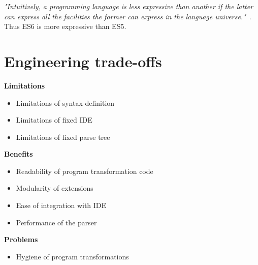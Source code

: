 \textit{"Intuitively, a programming language is less expressive than another if the latter can express all the facilities the former can express in the language universe."}~\cite{Felleisen1990}. Thus ES6 is more expressive than ES5.

\section{Engineering trade-offs}

\textbf{Limitations}
\begin{itemize}
	\item Limitations of syntax definition
	\item Limitations of fixed IDE
	\item Limitations of fixed parse tree
\end{itemize}

\textbf{Benefits}
\begin{itemize}
	\item Readability of program transformation code
	\item Modularity of extensions
	\item Ease of integration with IDE
	\item Performance of the parser
\end{itemize}

\textbf{Problems}
\begin{itemize}
	\item Hygiene of program transformations
\end{itemize}